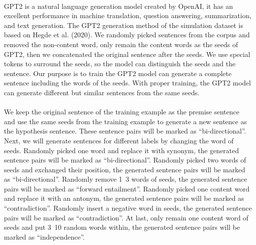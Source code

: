 \documentclass[12pt]{article}
\begin{document}
\begin{CJK*}{UTF8}{bkai}
\begin{spacing}{1.77}
\paragraph{}
GPT2\cite{radford2019language} is a natural language generation model created by OpenAI, it has an excellent performance in machine translation, question answering, summarization, and text generation. The GPT2 generation method of the simulation dataset is based on Hegde et al. (2020)\cite{hegde2020unsupervised}. We randomly picked sentences from the corpus and removed the non-content word, only remain the content words as the seeds of GPT2, then we concatenated the original sentence after the seeds. We use special tokens to surround the seeds, so the model can distinguish the seeds and the sentence. Our purpose is to train the GPT2 model can generate a complete sentence including the words of the seeds. With proper training, the GPT2 model can generate different but similar sentences from the same seeds.

\paragraph{}
We keep the original sentence of the training example as the premise sentence and use the same seeds from the training example to generate a new sentence as the hypothesis sentence. These sentence pairs will be marked as ``bi-directional''. Next, we will generate sentences for different labels by changing the word of seeds. Randomly picked one word and replace it with synonym, the generated sentence pairs will be marked as ``bi-directional''. Randomly picked two words of seeds and exchanged their position, the generated sentence pairs will be marked as ``bi-directional''. Randomly remove 1~3 words of seeds, the generated sentence pairs will be marked as ``forward entailment''. Randomly picked one content word and replace it with an antonym, the generated sentence pairs will be marked as ``contradiction''. Randomly insert a negative word in seeds, the generated sentence pairs will be marked as ``contradiction''. At last, only remain one content word of seeds and put 3~10 random words within, the generated sentence pairs will be marked as ``independence''.


\end{spacing}
\end{CJK*}
\end{document}

